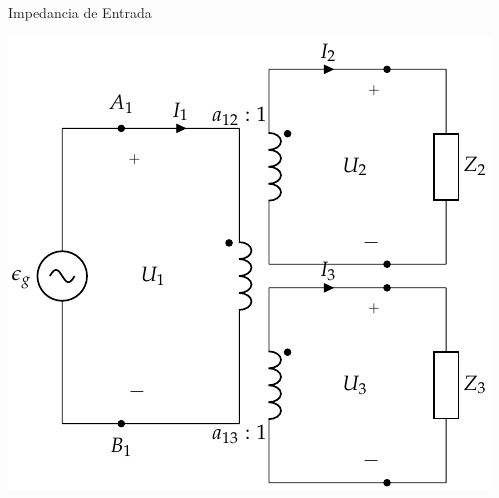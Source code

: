 \documentclass[aspectratio=169, usenames,svgnames,dvipsnames]{beamer}
\begin{document}
\begin{frame}[label={sec:org04ed8ae}]{Impedancia de Entrada}
\begin{center}
\includegraphics[height=0.9\textheight]{../figs/TrafoIdealVariosDevanados_Impedancia.pdf}
\end{center}
\end{frame}
\end{document}
